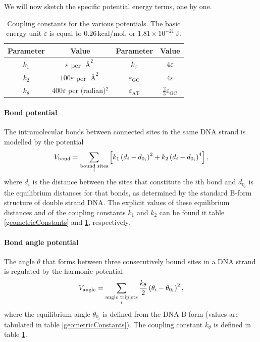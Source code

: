 We will now sketch the specific potential energy terms, one by one.

\begin{table}[hbt]
\label{couplingConstants}
\begin{center}
\caption{Coupling constants for the various potentials. The basic energy unit $\varepsilon$ is equal to $0.26$\,kcal/mol, or $1.81 \times 10^{-21}$\,J.}

\begin{tabular}{cc||cc}
Parameter & Value & Parameter & Value\\\hline
$k_1$ & $\varepsilon$ per $\Angstrom^2$ &
	$k_\phi$ & $4\varepsilon$ \\
$k_2$ & $100\varepsilon$ per $\Angstrom^2$ &
	$\varepsilon_\text{GC}$ & $4\varepsilon$\\
$k_\theta$ & $400\varepsilon$ per (radian)$^2$ &
	$\varepsilon_\text{AT}$ & $\frac{2}{3} \varepsilon_\text{GC}$ \\
\end{tabular}
\end{center}
\end{table}


\paragraph{Bond potential}
The intramolecular bonds between connected sites in the same DNA strand is modelled by the potential
\begin{equation}
V_\text{bond}
= \sum_{\substack{\text{bound sites}\\i}} \left[
	k_1 \left(d_i - d_{0_i}\right)^2
	+ k_2 \left(d_i - d_{0_i}\right)^4
\right],
\end{equation}
where $d_i$ is the distance between the sites that constitute the $i$th bond and $d_{0_i}$ is the equilibrium distances for that bonds, as determined by the standard B-form structure of double strand DNA. The explicit values of these equilibrium distances and of the coupling constants $k_1$ and $k_2$ can be found it table \ref{geometricConstants} and \ref{couplingConstants}, respectively.


\paragraph{Bond angle potential}
The angle $\theta$ that forms between three consecutively bound sites in a DNA strand is regulated by the harmonic potential
\begin{equation}
V_\text{angle}
= \sum_{\substack{\text{angle triplets}\\i}}
	\frac{k_\theta}{2} \left(
		\theta_i - \theta_{0_i}
	\right)^2,
\end{equation}
where the equilibrium angle $\theta_{0_i}$ is defined from the DNA B-form (values are tabulated in table \ref{geometricConstants}). The coupling constant $k_\theta$ is defined in table \ref{couplingConstants}.


